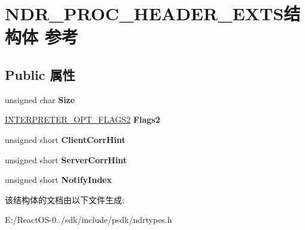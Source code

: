\hypertarget{struct_n_d_r___p_r_o_c___h_e_a_d_e_r___e_x_t_s}{}\section{N\+D\+R\+\_\+\+P\+R\+O\+C\+\_\+\+H\+E\+A\+D\+E\+R\+\_\+\+E\+X\+T\+S结构体 参考}
\label{struct_n_d_r___p_r_o_c___h_e_a_d_e_r___e_x_t_s}
\subsection*{Public 属性}
\begin{DoxyCompactItemize}
\item 
\mbox{\label{struct_n_d_r___p_r_o_c___h_e_a_d_e_r___e_x_t_s_ab9b4951a4ad414569c2eed9c39b87d41}} 
unsigned char {\bfseries Size}
\item 
\mbox{\label{struct_n_d_r___p_r_o_c___h_e_a_d_e_r___e_x_t_s_a01ca3f12be02725807a5e258c7c858eb}} 
\hyperlink{struct_i_n_t_e_r_p_r_e_t_e_r___o_p_t___f_l_a_g_s2}{I\+N\+T\+E\+R\+P\+R\+E\+T\+E\+R\+\_\+\+O\+P\+T\+\_\+\+F\+L\+A\+G\+S2} {\bfseries Flags2}
\item 
\mbox{\label{struct_n_d_r___p_r_o_c___h_e_a_d_e_r___e_x_t_s_ae4254897d9825c6411b5be9ff841aaf0}} 
unsigned short {\bfseries Client\+Corr\+Hint}
\item 
\mbox{\label{struct_n_d_r___p_r_o_c___h_e_a_d_e_r___e_x_t_s_ae8db39e5d3e4a0a0e11188d574da30ae}} 
unsigned short {\bfseries Server\+Corr\+Hint}
\item 
\mbox{\label{struct_n_d_r___p_r_o_c___h_e_a_d_e_r___e_x_t_s_a40f48f558a7b4168db397c2d90a0b235}} 
unsigned short {\bfseries Notify\+Index}
\end{DoxyCompactItemize}


该结构体的文档由以下文件生成\+:\begin{DoxyCompactItemize}
\item 
E\+:/\+React\+O\+S-\/0../sdk/include/psdk/ndrtypes.\+h\end{DoxyCompactItemize}
